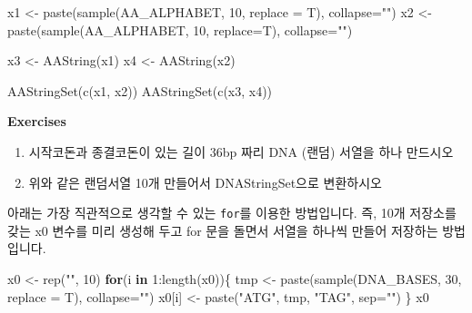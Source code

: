 \documentclass[
]{book}
\newenvironment{Shaded}{\begin{snugshade}}{\end{snugshade}}
\newcommand{\AttributeTok}[1]{\textcolor[rgb]{0.77,0.63,0.00}{#1}}
\newcommand{\ControlFlowTok}[1]{\textcolor[rgb]{0.13,0.29,0.53}{\textbf{#1}}}
\newcommand{\DecValTok}[1]{\textcolor[rgb]{0.00,0.00,0.81}{#1}}
\newcommand{\FunctionTok}[1]{\textcolor[rgb]{0.00,0.00,0.00}{#1}}
\newcommand{\NormalTok}[1]{#1}
\newcommand{\OtherTok}[1]{\textcolor[rgb]{0.56,0.35,0.01}{#1}}
\newcommand{\SpecialCharTok}[1]{\textcolor[rgb]{0.00,0.00,0.00}{#1}}
\newcommand{\StringTok}[1]{\textcolor[rgb]{0.31,0.60,0.02}{#1}}
\begin{document}
\begin{Shaded}
\begin{Highlighting}[]

\NormalTok{x1 }\OtherTok{\textless{}{-}} \FunctionTok{paste}\NormalTok{(}\FunctionTok{sample}\NormalTok{(AA\_ALPHABET, }\DecValTok{10}\NormalTok{, }\AttributeTok{replace =}\NormalTok{ T), }\AttributeTok{collapse=}\StringTok{""}\NormalTok{)}
\NormalTok{x2 }\OtherTok{\textless{}{-}} \FunctionTok{paste}\NormalTok{(}\FunctionTok{sample}\NormalTok{(AA\_ALPHABET, }\DecValTok{10}\NormalTok{, }\AttributeTok{replace=}\NormalTok{T), }\AttributeTok{collapse=}\StringTok{""}\NormalTok{)}

\NormalTok{x3 }\OtherTok{\textless{}{-}} \FunctionTok{AAString}\NormalTok{(x1)}
\NormalTok{x4 }\OtherTok{\textless{}{-}} \FunctionTok{AAString}\NormalTok{(x2)}

\FunctionTok{AAStringSet}\NormalTok{(}\FunctionTok{c}\NormalTok{(x1, x2))}
\FunctionTok{AAStringSet}\NormalTok{(}\FunctionTok{c}\NormalTok{(x3, x4))}
\end{Highlighting}
\end{Shaded}

\textbf{Exercises }

\begin{enumerate}
\def\labelenumi{\arabic{enumi}.}
\item
  시작코돈과 종결코돈이 있는 길이 36bp 짜리 DNA (랜덤) 서열을 하나 만드시오
\item
  위와 같은 랜덤서열 10개 만들어서 DNAStringSet으로 변환하시오
\end{enumerate}

아래는 가장 직관적으로 생각할 수 있는 \texttt{for}를 이용한 방법입니다. 즉, 10개 저장소를 갖는 x0 변수를 미리 생성해 두고 for 문을 돌면서 서열을 하나씩 만들어 저장하는 방법입니다.

\begin{Shaded}
\begin{Highlighting}[]
\NormalTok{x0 }\OtherTok{\textless{}{-}} \FunctionTok{rep}\NormalTok{(}\StringTok{""}\NormalTok{, }\DecValTok{10}\NormalTok{)}
\ControlFlowTok{for}\NormalTok{(i }\ControlFlowTok{in} \DecValTok{1}\SpecialCharTok{:}\FunctionTok{length}\NormalTok{(x0))\{}
\NormalTok{  tmp }\OtherTok{\textless{}{-}} \FunctionTok{paste}\NormalTok{(}\FunctionTok{sample}\NormalTok{(DNA\_BASES, }\DecValTok{30}\NormalTok{, }\AttributeTok{replace =}\NormalTok{ T), }\AttributeTok{collapse=}\StringTok{""}\NormalTok{)}
\NormalTok{  x0[i] }\OtherTok{\textless{}{-}} \FunctionTok{paste}\NormalTok{(}\StringTok{"ATG"}\NormalTok{, tmp, }\StringTok{"TAG"}\NormalTok{, }\AttributeTok{sep=}\StringTok{""}\NormalTok{)}
\NormalTok{\}}
\NormalTok{x0}
\end{Highlighting}
\end{Shaded}
\end{document}
